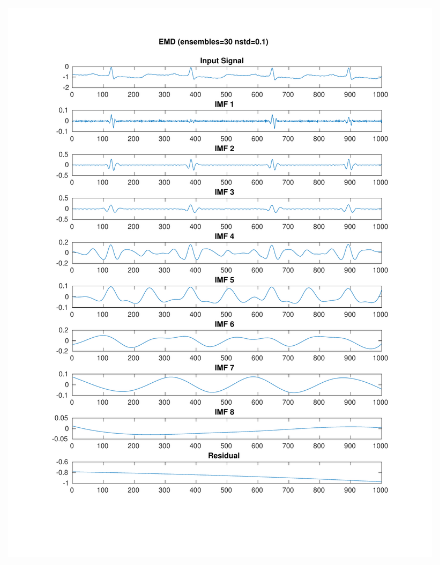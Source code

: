\documentclass[11pt,a4paper]{article}
\begin{document}
\begin{figure}[H]
\centering
\begin{minipage}{0.48\textwidth}
	\centering
	\includegraphics[width=\textwidth]{fig/112l1_emd_ensemble.pdf}
	

\end{minipage}
\end{figure}
\end{document}
